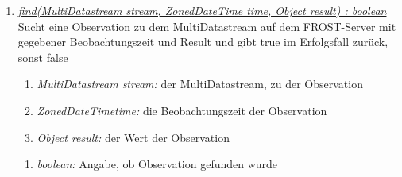 \begin{enumerate}[+]
	\item \underline{\textit{find(MultiDatastream stream, ZonedDateTime time, Object result) : boolean}} \\
	Sucht eine Observation zu dem MultiDatastream auf dem FROST-Server mit gegebener Beobachtungszeit und Result und gibt true im Erfolgsfall zurück, sonst false
	\begin{enumerate}[$\bullet$]
		\item \textit{MultiDatastream stream:} der MultiDatastream, zu der Observation
		\item \textit{ZonedDateTimetime:} die Beobachtungszeit der Observation
		\item \textit{Object result:} der Wert der Observation
	\end{enumerate}
	\vspace{-0.2cm}
	\begin{enumerate}[$\circ$]
		\item \textit{boolean:} Angabe, ob Observation gefunden wurde
	\end{enumerate}

\end{enumerate}